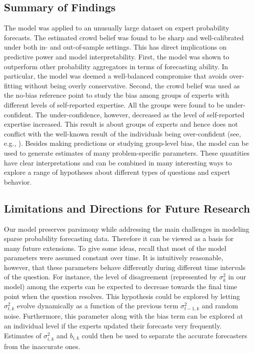 \documentclass[aoas, preprint]{imsart}
\numberwithin{equation}{section}
\theoremstyle{plain}
\begin{document}
\subsection{Summary of Findings}
The model was applied to an unusually large dataset on expert probability forecasts. The estimated crowd belief was found to be sharp and well-calibrated under both in- and out-of-sample settings. This has direct implications  on predictive power and model interpretability. First, the model was shown to outperform other probability aggregators in terms of forecasting ability. In particular, the model was deemed a well-balanced compromise that avoids over-fitting without being overly conservative. Second, the crowd belief was used as the no-bias reference point to study the bias among groups of experts with different levels of self-reported expertise. All the groups were found to be under-confident. The under-confidence, however, decreased as the level of self-reported expertise increased. This result is about groups of experts and hence does not conflict with the well-known result of the individuals being over-confident (see, e.g.,  \citet{lichtenstein1977calibration, morgan1992uncertainty, bier2004implications}). Besides making predictions or studying group-level bias, the model can be used to generate estimates of many problem-specific parameters. These quantities have clear interpretations and can be combined in many interesting ways to explore a range of hypotheses about different types of questions and expert behavior. 


\subsection{Limitations and Directions for Future Research}
Our model preserves parsimony while addressing the main challenges in modeling sparse probability forecasting data. Therefore it can be viewed as a basis for many future extensions. To give some ideas, recall that most of the model parameters were assumed constant over time. It is intuitively reasonable, however, that these parameters behave differently during different time intervals of the question.  For instance, the level of disagreement (represented by $\sigma^2_k$ in our model) among the experts can be expected to decrease towards the final time point when the question  resolves. This hypothesis could be explored by letting $\sigma^2_{t,k}$ evolve dynamically as a function of the previous term $\sigma^2_{t-1,k}$ and random noise. Furthermore, this parameter along with the bias term can be explored at an individual level if the experts updated their forecasts very frequently. Estimates of $\sigma_{i,k}^2$ and $b_{i,k}$ could then be used to separate the accurate forecasters from the inaccurate ones. 
\end{document}
